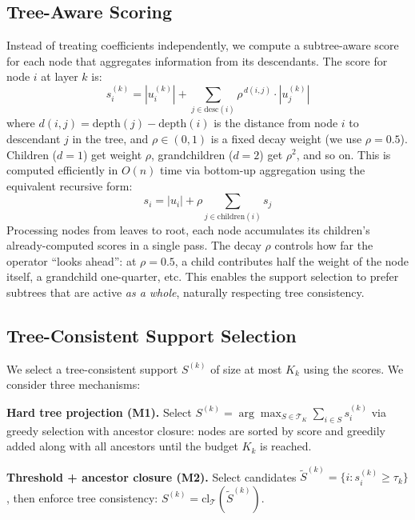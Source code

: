 \documentclass{article}
\begin{document}
\subsection{Tree-Aware Scoring}

Instead of treating coefficients independently, we compute a subtree-aware score for each node that aggregates information from its descendants. The score for node $i$ at layer $k$ is:
\begin{equation}
    s_i^{(k)} = |u_i^{(k)}| + \sum_{j \in \mathrm{desc}(i)} \rho^{\,d(i,j)} \cdot |u_j^{(k)}| \label{eq:score}
\end{equation}
where $d(i,j) = \mathrm{depth}(j) - \mathrm{depth}(i)$ is the distance from node $i$ to descendant $j$ in the tree, and $\rho \in (0,1)$ is a fixed decay weight (we use $\rho = 0.5$). Children ($d{=}1$) get weight $\rho$, grandchildren ($d{=}2$) get $\rho^2$, and so on. This is computed efficiently in $O(n)$ time via bottom-up aggregation using the equivalent recursive form:
\begin{equation}
    s_i = |u_i| + \rho \!\!\sum_{j \in \mathrm{children}(i)} \!\!s_j \label{eq:score_recursive}
\end{equation}
Processing nodes from leaves to root, each node accumulates its children's already-computed scores in a single pass. The decay $\rho$ controls how far the operator ``looks ahead'': at $\rho = 0.5$, a child contributes half the weight of the node itself, a grandchild one-quarter, etc. This enables the support selection to prefer subtrees that are active \emph{as a whole}, naturally respecting tree consistency.

\subsection{Tree-Consistent Support Selection}

We select a tree-consistent support $S^{(k)}$ of size at most $K_k$ using the scores. We consider three mechanisms:

\textbf{Hard tree projection (M1).} Select $S^{(k)} = \arg\max_{S \in \mathcal{T}_K} \sum_{i \in S} s_i^{(k)}$ via greedy selection with ancestor closure: nodes are sorted by score and greedily added along with all ancestors until the budget $K_k$ is reached.

\textbf{Threshold + ancestor closure (M2).} Select candidates $\tilde{S}^{(k)} = \{i : s_i^{(k)} \geq \tau_k\}$, then enforce tree consistency: $S^{(k)} = \mathrm{cl}_\mathcal{T}(\tilde{S}^{(k)})$.
\end{document}
